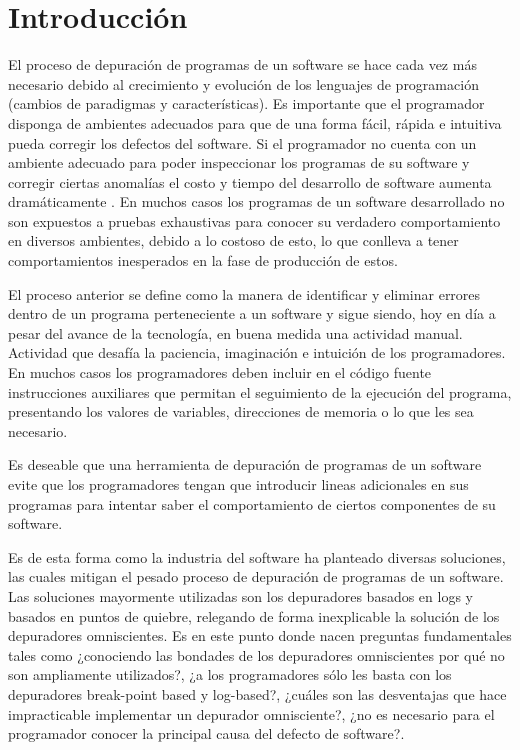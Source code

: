 \documentclass[12pt,legalpaper]{report}
\begin{document}
\newpage
\tableofcontents
\newpage
\listoffigures
\newpage
\listoftables
\newpage

\chapter{Introducción}

El proceso de depuración de programas de un software se hace cada vez más necesario debido al crecimiento y evolución de los lenguajes de programación (cambios de paradigmas y características).  Es importante que el programador disponga de ambientes adecuados para que de una forma fácil, rápida e intuitiva pueda corregir los defectos del software.  Si el programador no cuenta con un ambiente adecuado para poder inspeccionar los programas de su software y corregir ciertas anomalías el costo y tiempo del desarrollo de software aumenta dramáticamente \cite{cost}. En muchos casos los programas de un software desarrollado no son expuestos a pruebas exhaustivas para conocer su verdadero comportamiento en diversos ambientes, debido a lo costoso de esto, lo que conlleva a tener comportamientos inesperados en la fase de producción de estos.

El proceso anterior se define como la manera de identificar y eliminar errores dentro de un programa perteneciente a un software y sigue siendo, hoy en día a pesar del avance de la tecnología, en buena medida una actividad manual.  Actividad que desafía la paciencia, imaginación e intuición de los programadores.  En muchos casos los programadores deben incluir en el código fuente instrucciones auxiliares que permitan el seguimiento de la ejecución del programa, presentando los valores de variables, direcciones de memoria o lo que les sea necesario.

Es deseable que una herramienta de depuración de programas de un software evite que los programadores tengan que introducir lineas adicionales en sus programas para intentar saber el comportamiento de ciertos componentes de su software.

Es de esta forma como la industria del software ha planteado diversas soluciones, las cuales mitigan el pesado proceso de depuración de programas de un software.  Las soluciones mayormente utilizadas son los depuradores basados en logs y basados en puntos de quiebre, relegando de forma inexplicable la solución de los depuradores omniscientes.  Es en este punto donde nacen preguntas fundamentales tales como ¿conociendo las bondades de los depuradores omniscientes por qué no son ampliamente utilizados?, ¿a los programadores sólo les basta con los depuradores break-point based y log-based?, ¿cuáles son las desventajas que hace impracticable implementar un depurador omnisciente?, ¿no es necesario para el programador conocer la principal causa del defecto de software?.
\end{document}
